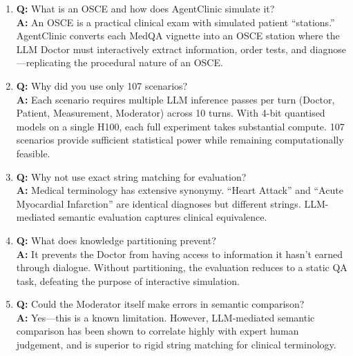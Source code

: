 \begin{vivabox}[\textcolor{white}{Likely Viva Questions}]
\begin{enumerate}
    \item \textbf{Q:} What is an OSCE and how does AgentClinic simulate it?\\
    \textbf{A:} An OSCE is a practical clinical exam with simulated patient ``stations.'' AgentClinic converts each MedQA vignette into an OSCE station where the LLM Doctor must interactively extract information, order tests, and diagnose---replicating the procedural nature of an OSCE.

    \item \textbf{Q:} Why did you use only 107 scenarios?\\
    \textbf{A:} Each scenario requires multiple LLM inference passes per turn (Doctor, Patient, Measurement, Moderator) across 10 turns. With 4-bit quantised models on a single H100, each full experiment takes substantial compute. 107 scenarios provide sufficient statistical power while remaining computationally feasible.

    \item \textbf{Q:} Why not use exact string matching for evaluation?\\
    \textbf{A:} Medical terminology has extensive synonymy. ``Heart Attack'' and ``Acute Myocardial Infarction'' are identical diagnoses but different strings. LLM-mediated semantic evaluation captures clinical equivalence.

    \item \textbf{Q:} What does knowledge partitioning prevent?\\
    \textbf{A:} It prevents the Doctor from having access to information it hasn't earned through dialogue. Without partitioning, the evaluation reduces to a static QA task, defeating the purpose of interactive simulation.

    \item \textbf{Q:} Could the Moderator itself make errors in semantic comparison?\\
    \textbf{A:} Yes---this is a known limitation. However, LLM-mediated semantic comparison has been shown to correlate highly with expert human judgement, and is superior to rigid string matching for clinical terminology.
\end{enumerate}
\end{vivabox}
